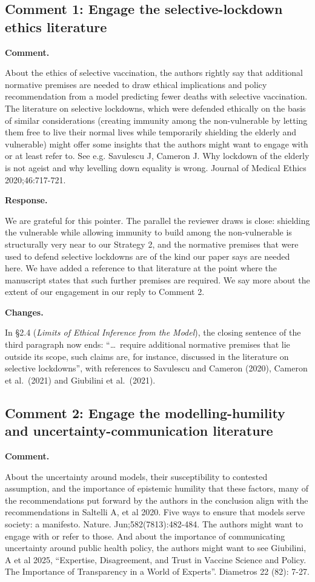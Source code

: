 \documentclass[a4paper,12pt]{article}
\newcommand{\reply}[1]{#1}
\newcommand{\rlabel}[1]{\par\medskip\noindent\textbf{#1}\par\nobreak}
\begin{document}
\subsection*{Comment 1: Engage the selective-lockdown ethics literature}

\rlabel{Comment.}
About the ethics of selective vaccination, the authors rightly say that additional normative premises are needed to draw ethical implications and policy recommendation from a model predicting fewer deaths with selective vaccination. The literature on selective lockdowns, which were defended ethically on the basis of similar considerations (creating immunity among the non-vulnerable by letting them free to live their normal lives while temporarily shielding the elderly and vulnerable) might offer some insights that the authors might want to engage with or at least refer to. See e.g. Savulescu J, Cameron J. Why lockdown of the elderly is not ageist and why levelling down equality is wrong. Journal of Medical Ethics 2020;46:717-721.

\rlabel{Response.}
\reply{We are grateful for this pointer. The parallel the reviewer draws is
close: shielding the vulnerable while allowing immunity to build among the
non-vulnerable is structurally very near to our Strategy 2, and the normative
premises that were used to defend selective lockdowns are of the kind our
paper says are needed here. We have added a reference to that literature at
the point where the manuscript states that such further premises are required.
We say more about the extent of our engagement in our reply to Comment 2.}

\rlabel{Changes.}
\reply{In \S2.4 (\emph{Limits of Ethical Inference from the Model}), the closing
sentence of the third paragraph now ends: ``\dots\ require additional normative
premises that lie outside its scope, such claims are, for instance, discussed
in the literature on selective lockdowns'', with references to Savulescu and
Cameron (2020), Cameron et al.\ (2021) and Giubilini et al.\ (2021).}

\subsection*{Comment 2: Engage the modelling-humility and uncertainty-communication literature}

\rlabel{Comment.}
About the uncertainty around models, their susceptibility to contested assumption, and the importance of epistemic humility that these factors, many of the recommendations put forward by the authors in the conclusion align with the recommendations in Saltelli A, et al 2020. Five ways to ensure that models serve society: a manifesto. Nature. Jun;582(7813):482-484. The authors might want to engage with or refer to those. And about the importance of communicating uncertainty around public health policy, the authors might want to see Giubilini, A et al 2025, ``Expertise, Disagreement, and Trust in Vaccine Science and Policy. The Importance of Transparency in a World of Experts''. Diametros 22 (82): 7-27.
\end{document}
